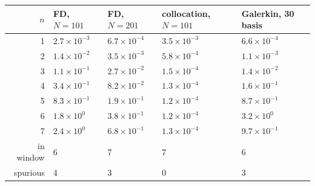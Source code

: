 \begin{tabular}{rllll}
\toprule
$n$ & FD, $N=101$ & FD, $N=201$ & collocation, $N=101$ & Galerkin, 30 basis\\
\midrule
1 & $2.7\times10^{-3}$ & $6.7\times10^{-4}$ & $3.5\times10^{-3}$ & $6.6\times10^{-4}$\\
2 & $1.4\times10^{-2}$ & $3.5\times10^{-3}$ & $5.8\times10^{-4}$ & $1.1\times10^{-3}$\\
3 & $1.1\times10^{-1}$ & $2.7\times10^{-2}$ & $1.5\times10^{-4}$ & $1.4\times10^{-2}$\\
4 & $3.4\times10^{-1}$ & $8.2\times10^{-2}$ & $1.3\times10^{-4}$ & $1.6\times10^{-1}$\\
5 & $8.3\times10^{-1}$ & $1.9\times10^{-1}$ & $1.2\times10^{-4}$ & $8.7\times10^{-1}$\\
6 & $1.8\times10^{0}$ & $3.8\times10^{-1}$ & $1.2\times10^{-4}$ & $3.2\times10^{0}$\\
7 & $2.4\times10^{0}$ & $6.8\times10^{-1}$ & $1.3\times10^{-4}$ & $9.7\times10^{-1}$\\
\midrule
in window & 6 & 7 & 7 & 6\\
spurious & 4 & 3 & 0 & 3\\
\bottomrule
\end{tabular}
